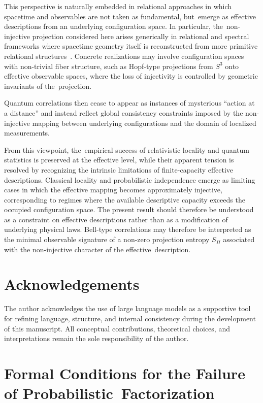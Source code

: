 \documentclass[11pt,a4paper]{article}
\theoremstyle{remark}
\begin{document}
  This perspective is naturally embedded in relational approaches in which spacetime
  and observables are not taken as fundamental, but~emerge as effective descriptions
  from an underlying configuration space.
  In particular, the~non-injective projection considered here arises generically in
  relational and spectral frameworks where spacetime geometry itself is reconstructed
  from more primitive relational structures~\cite{Beau2026a}.
  Concrete realizations may involve configuration spaces with non-trivial fiber
  structure, such as Hopf-type projections from $S^3$ onto effective observable
  spaces, where the loss of injectivity is controlled by geometric invariants of
  the~projection.

  Quantum correlations then cease to appear as instances of mysterious ``action at a
  distance'' and instead reflect global consistency constraints imposed by the
  non-injective mapping between underlying configurations and the domain of localized
  measurements.

  From this viewpoint, the~empirical success of relativistic locality and quantum
  statistics is preserved at the effective level, while their apparent tension is resolved
  by recognizing the intrinsic limitations of finite-capacity effective descriptions.
  Classical locality and probabilistic independence emerge as limiting cases in which
  the effective mapping becomes approximately injective, corresponding to regimes where
  the available descriptive capacity exceeds the occupied configuration space.
  The present result should therefore be understood as a constraint on effective
  descriptions rather than as a modification of underlying physical laws.
  Bell-type correlations may therefore be interpreted as the minimal observable
  signature of a non-zero projection entropy $S_{\Pi}$ associated with the
  non-injective character of the effective~description.

  \section*{Acknowledgements}
    The author acknowledges the use of large language models as a supportive tool for refining
    language, structure, and internal consistency during the development of this manuscript.
    All conceptual contributions, theoretical choices, and interpretations remain the sole
    responsibility of the author.

\appendix


\section{Formal Conditions for the Failure of Probabilistic~Factorization}
  \label{app:factorization}
\end{document}
